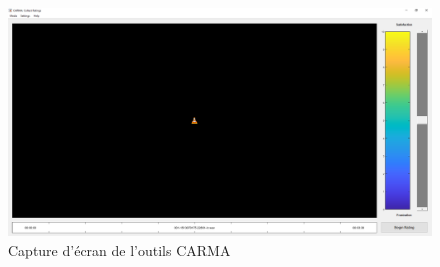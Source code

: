\begin{figure}[h]
  \centering
  \includegraphics[width=15cm]{./Chapitre4/figures/carma.png}
  \caption{Capture d'écran de l'outils CARMA~\cite{Girard2014}}
  \label{fig:carma}
\end{figure}
